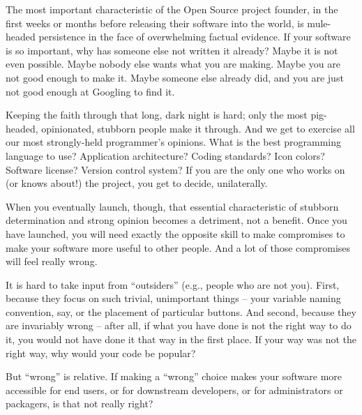 

\noindent{}The most important characteristic of the Open Source project founder, in the
first weeks or months before releasing their software into the world, is
mule-headed persistence in the face of overwhelming factual evidence. If your
software is so important, why has someone else not written it already? Maybe it is not even possible. Maybe nobody else wants what you are making. Maybe you are not good enough to make it. Maybe someone else already did, and you are just not good enough at Googling to find it.

Keeping the faith through that long, dark night is hard; only the most
pig-headed, opinionated, stubborn people make it through. And we get to exercise
all our most strongly-held programmer's opinions. What is the best programming
language to use? Application architecture? Coding standards? Icon colors?
Software license? Version control system? If you are the only one who works on
(or knows about!) the project, you get to decide, unilaterally.

When you eventually launch, though, that essential characteristic of stubborn
determination and strong opinion becomes a detriment, not a benefit. Once you have launched, you will need exactly the opposite skill to make compromises to make your software more useful to other people. And a lot of those compromises will feel really wrong.

It is hard to take input from ``outsiders'' (e.g., people who are not you). First, because they focus on such trivial, unimportant things -- your variable naming convention, say, or the placement of particular buttons. And second, because they are invariably wrong -- after all, if what you have done is not the right way to do it, you would not have done it that way in the first place. If your way was not the right way, why would your code be popular?

But ``wrong'' is relative. If making a ``wrong'' choice makes your software more
accessible for end users, or for downstream developers, or for administrators or
packagers, is that not really right?

